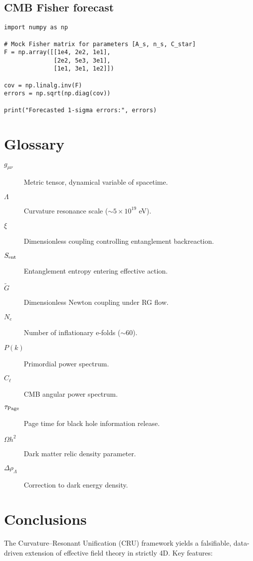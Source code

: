 \documentclass[%
 reprint,
 amsmath,amssymb,
 aps,
 pra,
 longbibliography,
 nofootinbib
]{revtex4-2}
\begin{document}
\section{CMB Fisher forecast}
\begin{verbatim}
import numpy as np

# Mock Fisher matrix for parameters [A_s, n_s, C_star]
F = np.array([[1e4, 2e2, 1e1],
              [2e2, 5e3, 3e1],
              [1e1, 3e1, 1e2]])

cov = np.linalg.inv(F)
errors = np.sqrt(np.diag(cov))

print("Forecasted 1-sigma errors:", errors)
\end{verbatim}

\chapter{Glossary}
\begin{description}
\item[$g_{\mu\nu}$] Metric tensor, dynamical variable of spacetime.
\item[$\Lambda$] Curvature resonance scale ($\sim 5\times10^{19}$ eV).
\item[$\xi$] Dimensionless coupling controlling entanglement backreaction.
\item[$S_{\rm ent}$] Entanglement entropy entering effective action.
\item[$\tilde G$] Dimensionless Newton coupling under RG flow.
\item[$N_e$] Number of inflationary e-folds ($\sim 60$).
\item[$P(k)$] Primordial power spectrum.
\item[$C_\ell$] CMB angular power spectrum.
\item[$\tau_{\rm Page}$] Page time for black hole information release.
\item[$\Omega h^2$] Dark matter relic density parameter.
\item[$\Delta \rho_\Lambda$] Correction to dark energy density.
\end{description}

\chapter{Conclusions}
The Curvature–Resonant Unification (CRU) framework yields a falsifiable, data-driven
extension of effective field theory in strictly 4D.  
Key features:
\end{document}
